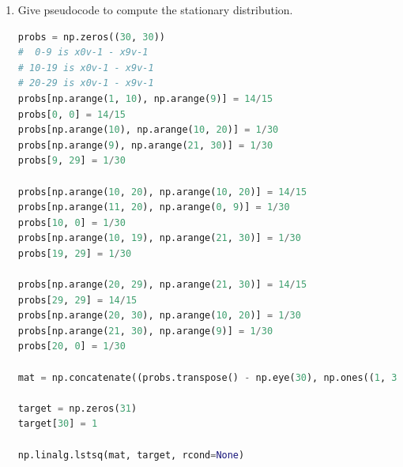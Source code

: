 \documentclass[10pt,\jkfside,a4paper]{article}
\begin{document}
\begin{enumerate}
\begin{enumerate}[label=(\alph*)]
\begin{center}
\end{center}

\item Give pseudocode to compute the stationary distribution.

\begin{lstlisting}[language=Python]
probs = np.zeros((30, 30))
#  0-9 is x0v-1 - x9v-1
# 10-19 is x0v-1 - x9v-1
# 20-29 is x0v-1 - x9v-1
probs[np.arange(1, 10), np.arange(9)] = 14/15
probs[0, 0] = 14/15
probs[np.arange(10), np.arange(10, 20)] = 1/30
probs[np.arange(9), np.arange(21, 30)] = 1/30
probs[9, 29] = 1/30

probs[np.arange(10, 20), np.arange(10, 20)] = 14/15
probs[np.arange(11, 20), np.arange(0, 9)] = 1/30
probs[10, 0] = 1/30
probs[np.arange(10, 19), np.arange(21, 30)] = 1/30
probs[19, 29] = 1/30

probs[np.arange(20, 29), np.arange(21, 30)] = 14/15
probs[29, 29] = 14/15
probs[np.arange(20, 30), np.arange(10, 20)] = 1/30
probs[np.arange(21, 30), np.arange(9)] = 1/30
probs[20, 0] = 1/30

mat = np.concatenate((probs.transpose() - np.eye(30), np.ones((1, 30))))

target = np.zeros(31)
target[30] = 1

np.linalg.lstsq(mat, target, rcond=None)
\end{lstlisting}

\end{enumerate}

\end{enumerate}
\end{document}
